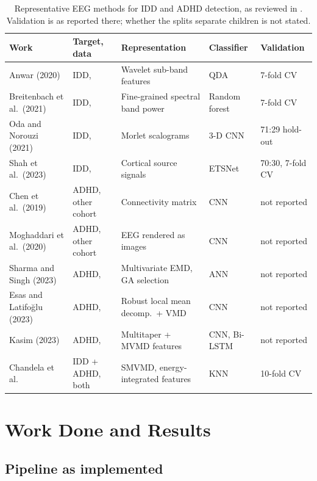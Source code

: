 \documentclass[11pt,a4paper]{article}
\begin{document}
\begin{table}[t]
\centering\footnotesize
\caption{Representative EEG methods for IDD and ADHD detection, as reviewed
in \cite{chandela2025}. Validation is as reported there; whether the splits
separate children is not stated.}
\label{tab:lit}
\begin{tabularx}{\textwidth}{l l X l l}
\toprule
Work & Target, data & Representation & Classifier & Validation \\
\midrule
Anwar (2020) & IDD, \cite{sareen2020data} & Wavelet sub-band features & QDA & 7-fold CV \\
Breitenbach et al.\ (2021) & IDD, \cite{sareen2020data} & Fine-grained spectral band power & Random forest & 7-fold CV \\
Oda and Norouzi (2021) & IDD, \cite{sareen2020data} & Morlet scalograms & 3-D CNN & 71:29 hold-out \\
Shah et al.\ (2023) & IDD, \cite{sareen2020data} & Cortical source signals & ETSNet & 70:30, 7-fold CV \\
Chen et al.\ (2019) & ADHD, other cohort & Connectivity matrix & CNN & not reported \\
Moghaddari et al.\ (2020) & ADHD, other cohort & EEG rendered as images & CNN & not reported \\
Sharma and Singh (2023) & ADHD, \cite{motie2020} & Multivariate EMD, GA selection & ANN & not reported \\
Esas and Latifo\u{g}lu (2023) & ADHD, \cite{motie2020} & Robust local mean decomp.\ + VMD & CNN & not reported \\
Kasim (2023) & ADHD, \cite{motie2020} & Multitaper + MVMD features & CNN, Bi-LSTM & not reported \\
Chandela et al.\ \cite{chandela2025} & IDD + ADHD, both & SMVMD, energy-integrated features & KNN & 10-fold CV \\
\bottomrule
\end{tabularx}
\end{table}

\section{Work Done and Results}

\subsection{Pipeline as implemented}
\end{document}
